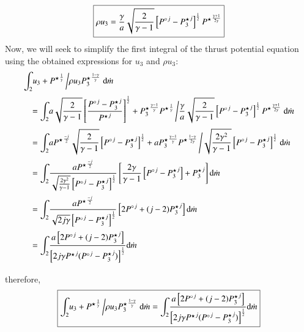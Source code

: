\documentclass{warpdoc}
\numberwithin{equation}{section}
\newcommand{\alb}{\vspace{0.2cm}\\} %
\newcommand{\mfd}{\displaystyle}
\newcommand{\ordi}{{\rm d}}
\newcommand{\mdot}{\dot{m}}
\newcommand\frameeqn[1]{\fbox{$#1$}}
\begin{document}
%
%
\begin{equation}
 \frameeqn{
   \mfd \rho u_3
  = \frac{\gamma}{a} \sqrt{\frac{2 }{\gamma-1}}
    \left[ {P^\circ}^j-{P_3^\star}^j \right]^\frac{1}{2}
    {P^\star}^\frac{\gamma+1}{2\gamma}
 }
\end{equation}
%
Now, we will seek to simplify the first integral of
the thrust potential equation using the obtained expressions
for $u_3$ and $\rho u_3$:
%
\begin{equation}
\begin{array}{l}
\mfd\int_2 \! u_{3}
 + {P^\star}^{\frac{1}{\gamma}}  \left/ \rho u_{3}{P_3^\star}^{\frac{1-\gamma}{\gamma}}
    \right.\ordi \mdot \alb
~~~~=\mfd\int_2 \! a \sqrt{\frac{2 }{\gamma-1}} \left[ \frac{{P^\circ}^j-{P_3^\star}^j}{{P^\star}^j}
    \right]^\frac{1}{2}
 + {P_3^\star}^{\frac{\gamma-1}{\gamma}} {P^\star}^{\frac{1}{\gamma}}  \left/
\frac{\gamma}{a} \sqrt{\frac{2 }{\gamma-1}}
    \left[ {P^\circ}^j-{P_3^\star}^j \right]^\frac{1}{2}
    {P^\star}^\frac{\gamma+1}{2\gamma}
    \right.\ordi \mdot \alb
~~~~=\mfd\int_2 \! a {P^\star}^{\frac{-j}{2}} \sqrt{\frac{2 }{\gamma-1}} \left[{P^\circ}^j-{P_3^\star}^j\right]^\frac{1}{2}
 + a {P_3^\star}^{\frac{\gamma-1}{\gamma}} {P^\star}^{\frac{1-\gamma}{2\gamma}}  \left/
   \sqrt{\frac{2 \gamma^2}{\gamma-1}}
    \left[ {P^\circ}^j-{P_3^\star}^j \right]^\frac{1}{2}
    \right.\ordi \mdot \alb
~~~~=\mfd\int_2 \!
  \frac{
   a {P^\star}^{\frac{-j}{2}}
  }{
   \sqrt{\frac{2 \gamma^2}{\gamma-1}}
    \left[ {P^\circ}^j-{P_3^\star}^j \right]^\frac{1}{2}
  }
  \left[
    \frac{2 \gamma}{\gamma-1} \left[{P^\circ}^j-{P_3^\star}^j\right]
 + {P_3^\star}^j
  \right] \ordi \mdot\alb
~~~~=\mfd\int_2 \!
  \frac{
   a {P^\star}^{\frac{-j}{2}}
  }{
   \sqrt{2 j \gamma}
    \left[ {P^\circ}^j-{P_3^\star}^j \right]^\frac{1}{2}
  }
  \left[ 2 {P^\circ}^j + (j-2) {P_3^\star}^j \right] \ordi \mdot\alb
~~~~=\mfd\int_2 \!
  \frac{
   a \left[ 2 {P^\circ}^j + (j-2) {P_3^\star}^j \right]
  }{
    \left[2 j \gamma {P^\star}^j ( {P^\circ}^j-{P_3^\star}^j) \right]^\frac{1}{2}
  }
   \ordi \mdot\alb
\end{array}
\end{equation}
%
therefore,
%
\begin{equation}
\frameeqn{
\mfd\int_2 \! u_{3}
 + {P^\star}^{\frac{1}{\gamma}}  \left/ \rho u_{3}{P_3^\star}^{\frac{1-\gamma}{\gamma}}
    \right.\ordi \mdot
   =\mfd\int_2 \!
  \frac{
   a \left[ 2 {P^\circ}^j + (j-2) {P_3^\star}^j \right]
  }{
    \left[2 j \gamma {P^\star}^j ( {P^\circ}^j-{P_3^\star}^j) \right]^\frac{1}{2}
  }
   \ordi \mdot
 }
\end{equation}
%
\end{document}
